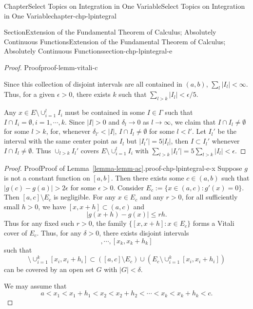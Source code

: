 \documentclass[oneside,10pt,]{book}
\newcommand{\xreffont}{\relax}
\numberwithin{equation}{section}
\begin{document}
\begin{chapterptx}{Chapter}{Select Topics on Integration in One Variable}{}{Select Topics on Integration in One Variable}{}{}{chapter-chp-lpintegral}
\begin{sectionptx}{Section}{Extension of the Fundamental Theorem of Calculus; Absolutely Continuous Functions}{}{Extension of the Fundamental Theorem of Calculus; Absolutely Continuous Functions}{}{}{section-chp-lpintegral-e}
\begin{proof}{Proof}{}{proof-lemm-vitali-c}
\par
Since this collection of disjoint intervals are all contained in \((a, b)\), \(\sum_{l} |I_{l}| < \infty\). Thus, for a given \(\epsilon > 0\), there exists \(k\) such that \(\sum_{l> k} |I_{l}| <  \epsilon/5\).%
\par
Any \(x\in E\setminus \cup_{i=1}^{l}I_{i}\) must be contained in some \(I\in \Gamma\) such that \(I \cap I_{i}=\emptyset, i=1,\cdots, k\). Since \(|I| > 0\) and \(\delta_{l}\to 0\) as \(l\to\infty\), we claim that \(I\cap I_{l}\ne \emptyset\) for some \(l > k\), for, whenever \(\delta_{l'} < |I|\), \(I\cap I_{l}\ne \emptyset\) for some \(l < l'\). Let \(I_{l}'\) be the interval with the same center point as \(I_{l}\) but \(|I_{l}'|=5 |I_{l}|\), then \(I\subset I_{l}'\) whenever \(I\cap I_{l}\ne \emptyset\). Thus \(\cup_{l > k} I_{l}'\) covers \(E\setminus \cup_{i=1}^{l}I_{i}\) with \(\sum_{l > k}  |I_{l}'| =5 \sum_{l > k}  |I_{l}|< \epsilon\).%
\end{proof}
\begin{proof}{Proof}{Proof of Lemma~{\xreffont\ref*{lemma-lemm-ac}}.}{proof-chp-lpintegral-e-x}
Suppose \(g\) is not a constant function on \([a, b]\). Then there exists some \(c\in (a, b)\) such that \(|g(c)-g(a)| > 2\epsilon\) for some \(\epsilon  > 0\). Consider \(E_{c} :=\{x\in (a, c): g'(x)=0\}\). Then \([a, c]\setminus E_{c}\) is negligible. For any \(x\in E_{c}\) and any \(r > 0\), for all sufficiently small \(h > 0\), we have \([x, x+h]\subset (a, c)\) and%
\begin{equation*}
|g(x+h)-g(x)|\le r h.
\end{equation*}
Thus for any fixed such \(r > 0\), the family \(\{[x, x+h]: x\in E_{c}\}\) forms a Vitali cover of \(E_{c}\). Thus, for any \(\delta > 0\), there exists disjoint intervals%
\begin{equation*}
[x_{1}, x_{1}+h_{1}], \cdots, [x_{k}, x_{k}+h_{k}]
\end{equation*}
such that%
\begin{equation*}
[a, c] \setminus  \cup_{i=1}^{k} [x_{i}, x_{i}+h_{i}]
\subset \left([a, c]\setminus E_{c}\right) \cup \left( E_{c}\setminus \cup_{i=1}^{k} [x_{i}, x_{i}+h_{i}]\right)
\end{equation*}
can be covered by  an open set \(G\) with \(|G| < \delta\).%
\par
We may assume that%
\begin{equation*}
a < x_{1} < x_{1}+h_{1} < x_{2} < x_{2}+h_{2} < \cdots < x_{k} < x_{k}+h_{k} < c.
\end{equation*}

\end{proof}
\end{sectionptx}
\end{chapterptx}
\end{document}
